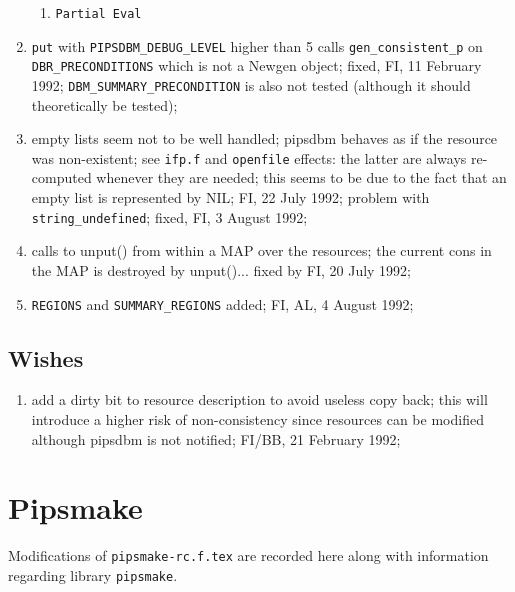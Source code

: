 \begin{enumerate}
\begin{enumerate}
    \item \verb+Partial Eval+

  \end{enumerate}

  \item \verb+put+ with \verb+PIPSDBM_DEBUG_LEVEL+ higher than 5 calls
	\verb+gen_consistent_p+ on \verb+DBR_PRECONDITIONS+ which is
	not a Newgen object; fixed, FI, 11 February 1992;
	\verb+DBM_SUMMARY_PRECONDITION+ is also not tested (although
	it should theoretically be tested);

  \item empty lists seem not to be well handled; pipsdbm behaves as
	if the resource was non-existent; see \verb+ifp.f+ and
	\verb+openfile+ effects: the latter are always re-computed
	whenever they are needed; this seems to be due to the fact
	that an empty list is represented by NIL; FI, 22 July 1992;
	problem with \verb+string_undefined+; fixed, FI, 3 August 1992;

  \item calls to unput() from within a MAP over the resources;
	the current cons in the MAP is destroyed by unput()...
	fixed by FI, 20 July 1992;

  \item \verb+REGIONS+ and \verb+SUMMARY_REGIONS+ added; FI, AL,
	4 August 1992;

\end{enumerate}

\subsection{Wishes}

\begin{enumerate}

  \item	add a dirty bit to resource description to avoid useless copy back;
	this will introduce a higher risk of non-consistency since 
	resources can be modified although pipsdbm is not notified;
	FI/BB, 21 February 1992;

\end{enumerate}

\newpage

\section{Pipsmake}

Modifications of \verb+pipsmake-rc.f.tex+ are recorded here along with
information regarding library \verb+pipsmake+.

